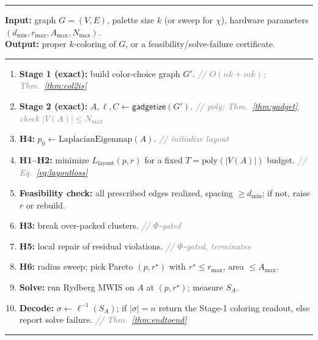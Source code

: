 \documentclass[11pt]{article}
\theoremstyle{definition}
\theoremstyle{remark}
\newcommand{\Comment}[1]{\hfill\textit{\footnotesize\textcolor{gray}{// #1}}}
\begin{document}
\begin{algorithm}[h]
\caption{Certified coloring-to-neutral-atom compiler}
\label{alg:pipeline}
\rule{\linewidth}{0.4pt}\vspace{-2pt}
\begin{flushleft}
\textbf{Input:} graph $G=(V,E)$, palette size $k$ (or sweep for $\chi$), hardware
parameters $(d_{\min},r_{\max},A_{\max},N_{\max})$.\\
\textbf{Output:} proper $k$-coloring of $G$, or a feasibility/solve-failure certificate.
\end{flushleft}
\vspace{-4pt}\rule{\linewidth}{0.4pt}
\begin{enumerate}[leftmargin=2.4em,itemsep=1pt,label=\arabic*.]
\item \textbf{Stage 1 (exact):} build color-choice graph $G'$.
      \Comment{$O(nk+mk)$; Thm.~\ref{thm:col2is}}
\item \textbf{Stage 2 (exact):} $A,\ell,C \gets \mathsf{gadgetize}(G')$.
      \Comment{poly; Thm.~\ref{thm:gadget}; check $|V(A)|\le N_{\max}$}
\item \textbf{H4:} $p_0 \gets \mathrm{LaplacianEigenmap}(A)$.
      \Comment{initialize layout}
\item \textbf{H1--H2:} minimize $L_{\mathrm{layout}}(p,r)$ for a fixed
      $T=\mathrm{poly}(|V(A)|)$ budget. \Comment{Eq.~\eqref{eq:layoutloss}}
\item \textbf{Feasibility check:} all prescribed edges realized, spacing $\ge d_{\min}$;
      if not, raise $r$ or rebuild.
\item \textbf{H3:} break over-packed clusters. \Comment{$\Phi$-gated}
\item \textbf{H5:} local repair of residual violations. \Comment{$\Phi$-gated, terminates}
\item \textbf{H6:} radius sweep; pick Pareto $(p,r^\star)$ with $r^\star\le r_{\max}$,
      area $\le A_{\max}$.
\item \textbf{Solve:} run Rydberg MWIS on $A$ at $(p,r^\star)$; measure $S_A$.
\item \textbf{Decode:} $\sigma\gets\ell^{-1}(S_A)$; if $|\sigma|=n$ return the Stage-1
      coloring readout, else report solve failure. \Comment{Thm.~\ref{thm:endtoend}}
\end{enumerate}
\vspace{-4pt}\rule{\linewidth}{0.4pt}
\end{algorithm}
\end{document}
